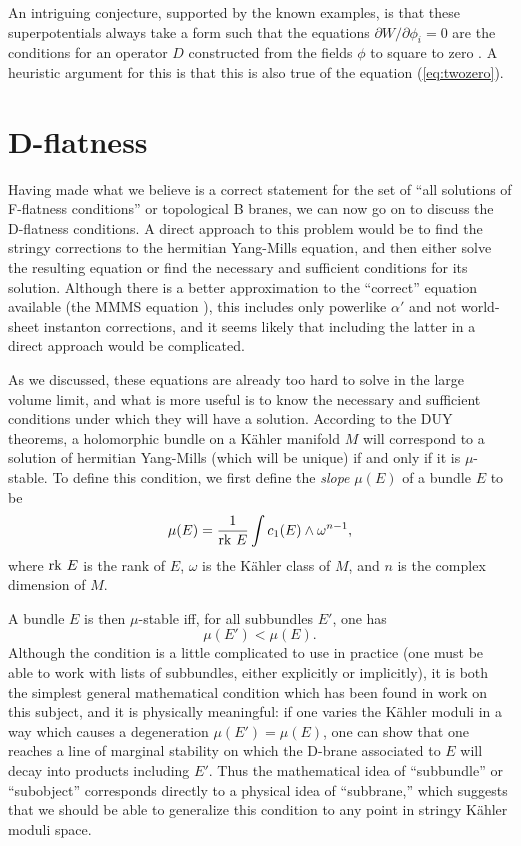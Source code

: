 \documentclass[a4paper,12pt]{amsart}
\numberwithin{equation}{section}
\theoremstyle{plain}
\theoremstyle{definition}
\def \ap {\alpha'}
\def\p{\partial}
\def\rk{{\rm rk\ }}
\begin{document}
An intriguing conjecture, supported by the known examples, is that
these superpotentials always take a form such that the equations $\p
W/\p \phi_i=0$ are the conditions for an operator $D$ constructed from
the fields $\phi$ to square to zero \cite{toappear}.  A heuristic
argument for this is that this is also true of the equation
(\ref{eq:twozero}).

\section{D-flatness}

Having made what we believe is a correct statement for the set of
``all solutions of F-flatness conditions'' or topological B branes, we
can now go on to discuss the D-flatness conditions.  A direct approach
to this problem would be to find the stringy corrections to the
hermitian Yang-Mills equation, and then either solve the resulting
equation or find the necessary and sufficient conditions for its
solution.  Although there is a better approximation to the ``correct''
equation available (the MMMS equation \cite{MMMS}), this includes only
powerlike $\ap$ and not world-sheet instanton corrections, and it
seems likely that including the latter in a direct approach would be
complicated.  

As we discussed, these equations are already too hard to solve in
the large volume limit, and what is more useful is to know the
necessary
and sufficient conditions under which they will have a solution.
According to the DUY theorems,
a holomorphic bundle on a K\"ahler manifold $M$
will correspond to a solution of hermitian Yang-Mills (which will
be unique) if and only if it is $\mu$-stable.  To define this
condition,
we first define the {\it slope} $\mu(E)$ of a bundle $E$ to be
\begin{equation}
\mu(E) = \frac{1}{\rk E}\int c_1(E)\wedge \omega^{n-1} ,
\end{equation}
where $\rk E$ is the rank of $E$, $\omega$ is the K\"ahler class of
$M$, and $n$ is the complex dimension of $M$.

A bundle $E$ is then $\mu$-stable iff, for all subbundles $E'$, one
has
\begin{equation}
\mu(E') < \mu(E).
\end{equation}
Although the condition is a little complicated to use in practice (one
must be able to work with lists of subbundles, either explicitly or
implicitly), it is both the simplest general mathematical condition
which has been found in work on this subject, and it is physically
meaningful: if one varies the K\"ahler moduli in a way which
causes a degeneration $\mu(E')=\mu(E)$, one can show that one reaches
a line of marginal stability on which the D-brane associated to $E$
will decay into products including $E'$.  Thus the mathematical idea
of ``subbundle'' or ``subobject'' corresponds directly to a physical
idea of ``subbrane,'' which suggests that we should be able to
generalize this condition to any point in stringy K\"ahler moduli
space.
\end{document}
